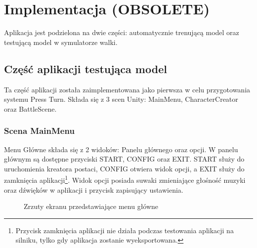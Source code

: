 \documentclass{SGGW-thesis}
\begin{document}
\chapter{Implementacja (OBSOLETE)}
Aplikacja jest podzielona na dwie części: automatycznie trenującą model oraz testującą model w symulatorze walki.


\section{Część aplikacji testująca model}
Ta część aplikacji została zaimplementowana jako pierwsza w celu przygotowania systemu Press Turn. Składa się z 3 scen Unity: MainMenu, CharacterCreator oraz BattleScene.

\subsection{Scena MainMenu}
Menu Główne składa się z 2 widoków: Panelu głównego oraz opcji. W panelu głównym są dostępne przyciski START, CONFIG oraz EXIT. START służy do uruchomienia kreatora postaci, CONFIG otwiera widok opcji, a EXIT służy do zamknięcia aplikacji\footnote{Przycisk zamknięcia aplikacji nie działa podczas testowania aplikacji na silniku, tylko gdy aplikacja zostanie wyeksportowana.}.
Widok opcji posiada suwaki zmieniające głośność muzyki oraz dźwięków w aplikacji i przycisk zapisujący ustawienia.

\begin{figure}[H]
  \hfill
  \hfill
  \hfill
  \caption{Zrzuty ekranu przedstawiające menu główne}
\end{figure}
\pagebreak
\end{document}
